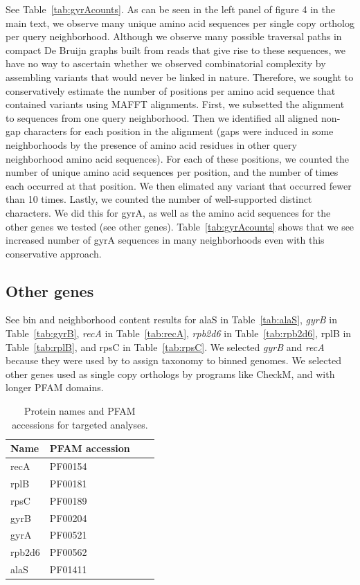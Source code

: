 See Table~\ref{tab:gyrAcounts}. As can be seen in the left panel of figure 4 in the 
main text, we observe many unique amino acid sequences per single copy ortholog 
per query neighborhood.
Although we observe many possible traversal paths in compact De Bruijn graphs built
from reads that give rise to these sequences, we have no way to ascertain whether we
observed combinatorial complexity by assembling variants that would never be linked 
in nature. Therefore, we sought to conservatively estimate the number of positions
per amino acid sequence that contained variants using MAFFT alignments. First, we 
subsetted the alignment to sequences from one query neighborhood. Then we identified
all aligned non-gap characters for each position in the alignment (gaps were induced
in some neighborhoods by the presence of amino acid residues in other query neighborhood
amino acid sequences). For each of these positions, we counted the number of unique 
amino acid sequences per position, and the number of times each occurred at that position. 
We then elimated any variant that occurred fewer than 10 times. Lastly, we counted the 
number of well-supported distinct characters. We did this for gyrA, as well as the 
amino acid sequences for the other genes we tested (see other genes). Table~\ref{tab:gyrAcounts}
shows that we see increased number of gyrA sequences in many neighborhoods even with
this conservative approach.  

\subsection{Other genes}

\label{subsec:othergenes}

See bin and neighborhood content results for alaS in Table~\ref{tab:alaS}, {\em gyrB} in 
Table~\ref{tab:gyrB}, {\em recA} in Table~\ref{tab:recA}, {\em rpb2d6} in Table~\ref{tab:rpb2d6}, 
rplB in Table~\ref{tab:rplB}, and rpsC in Table~\ref{tab:rpsC}. We selected {\em gyrB} and
{\em recA} because they were used by \hu to assign taxonomy to binned genomes. We selected
other genes used as single copy orthologs by programs like CheckM, and with longer PFAM
domains. 


\begin{table}
  \begin{tabular}{l l c c }
    \toprule
    Name & PFAM accession \\
    \midrule
    recA & PF00154 \\
    rplB & PF00181 \\
    rpsC & PF00189 \\
    gyrB & PF00204 \\
    gyrA & PF00521 \\
    rpb2d6 & PF00562 \\
    alaS & PF01411 \\
    \hline
    \bottomrule
  \end{tabular}
  \caption{Protein names and PFAM accessions for targeted analyses.}
  \label{tab:pfam_accessions}
\end{table}

